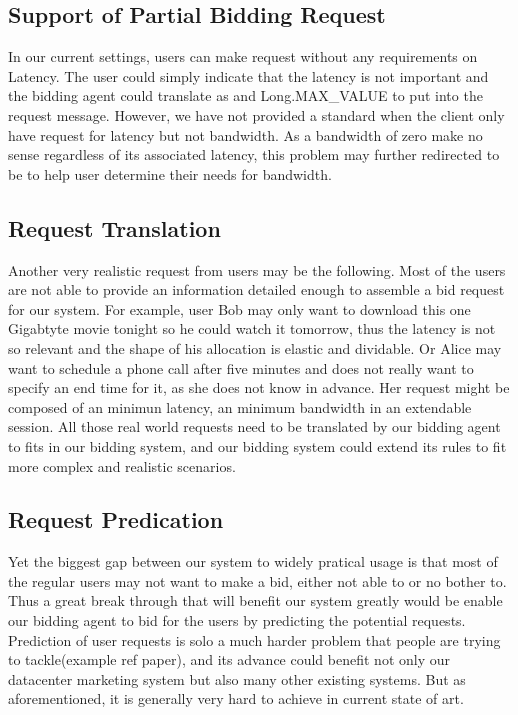 \documentclass[a4paper,11pt,twocolumn]{article}
\begin{document}
\subsection{Support of Partial Bidding Request}
In our current settings, users can make request without any requirements on Latency. The user could simply indicate that the latency 
is not important and the bidding agent  could translate as and Long.MAX\_VALUE to put into the request message. However,
 we have not provided a standard when the client only have request for latency but not bandwidth. As a bandwidth of zero make
 no sense regardless of its associated latency, this problem may further redirected to be to help user determine their needs for bandwidth.

\subsection{ Request Translation}
Another very realistic request from users may be the following. 
Most of the users are not able to provide an information detailed enough to assemble a bid request for our system. 
For example, user Bob may only want to download this one Gigabtyte movie tonight so he could watch it tomorrow, 
thus the latency is not so relevant and the shape of his allocation is elastic and dividable. Or 
Alice may want to schedule a phone call  after five minutes and does not really want to specify an end time for it, 
as she does not know in advance. Her request might be composed of an minimun latency, an minimum bandwidth in an extendable session. 
All those real world requests need to be translated by our bidding agent to fits in our bidding system, and our bidding system
 could extend its rules to fit more complex and realistic scenarios. 

\subsection{ Request Predication}
Yet the biggest gap between our system to widely pratical usage is that most of the regular users may not want to make a bid, 
either not able to or no bother to. Thus a great break through that will benefit our system greatly would be enable our bidding
 agent to bid for the users by predicting the potential requests.  Prediction of user requests is solo a much harder problem that 
people are trying to tackle(example ref paper), and its advance could benefit not only our datacenter marketing system but also many 
other existing systems. But as aforementioned, it is generally very hard to achieve in current state of art.
\end{document}
